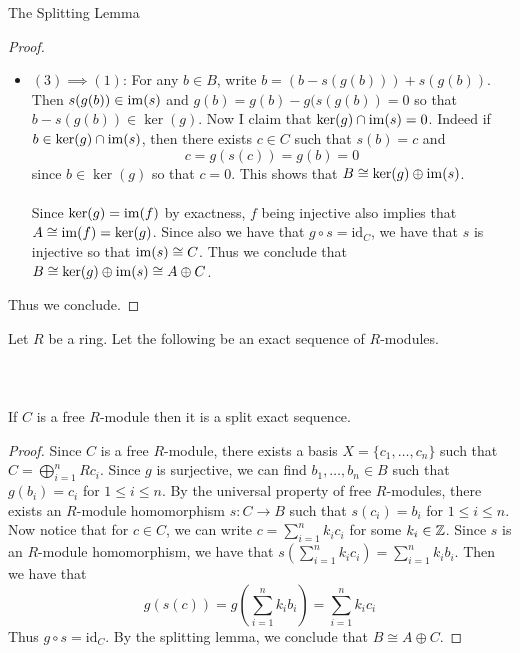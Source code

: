 \documentclass[a4paper]{article}
\begin{document}
\begin{prp}{The Splitting Lemma}{}
\begin{proof}
\begin{itemize}
\item $(3)\implies(1)$: For any $b\in B$, write $b=(b-s(g(b)))+s(g(b))$. Then $s(g(b))\in\operatorname{im}(s)$ and $g(b)=g(b)-g(s(g(b))=0$ so that $b-s(g(b))\in\ker(g)$. Now I claim that $\ker(g)\cap\operatorname{im}(s)=0$. Indeed if $b\in\ker(g)\cap\operatorname{im}(s)$, then there exists $c\in C$ such that $s(b)=c$ and $$c=g(s(c))=g(b)=0$$ since $b\in\ker(g)$ so that $c=0$. This shows that $B\cong\ker(g)\oplus\operatorname{im}(s)$. \\~\\

Since $\ker(g)=\operatorname{im}(f)$ by exactness, $f$ being injective also implies that $A\cong\operatorname{im}(f)=\ker(g)$. Since also we have that $g\circ s=\text{id}_C$, we have that $s$ is injective so that $\operatorname{im}(s)\cong C$. Thus we conclude that $B\cong\ker(g)\oplus\operatorname{im}(s)\cong A\oplus C$. 
\end{itemize}
Thus we conclude. 
\end{proof}
\end{prp}

\begin{prp}{}{} Let $R$ be a ring. Let the following be an exact sequence of $R$-modules. \\~\\
\\~\\
If $C$ is a free $R$-module then it is a split exact sequence. 
\begin{proof}
Since $C$ is a free $R$-module, there exists a basis $X=\{c_1,\dots,c_n\}$ such that $C=\bigoplus_{i=1}^nRc_i$. Since $g$ is surjective, we can find $b_1,\dots,b_n\in B$ such that $g(b_i)=c_i$ for $1\leq i\leq n$. By the universal property of free $R$-modules, there exists an $R$-module homomorphism $s:C\to B$ such that $s(c_i)=b_i$ for $1\leq i\leq n$. Now notice that for $c\in C$, we can write $c=\sum_{i=1}^nk_ic_i$ for some $k_i\in\mathbb{Z}$. Since $s$ is an $R$-module homomorphism, we have that $s\left(\sum_{i=1}^nk_ic_i\right)=\sum_{i=1}^nk_ib_i$. Then we have that $$g(s(c))=g\left(\sum_{i=1}^nk_ib_i\right)=\sum_{i=1}^nk_ic_i$$ Thus $g\circ s=\text{id}_C$. By the splitting lemma, we conclude that $B\cong A\oplus C$. 
\end{proof}
\end{prp}

\pagebreak
\end{document}
